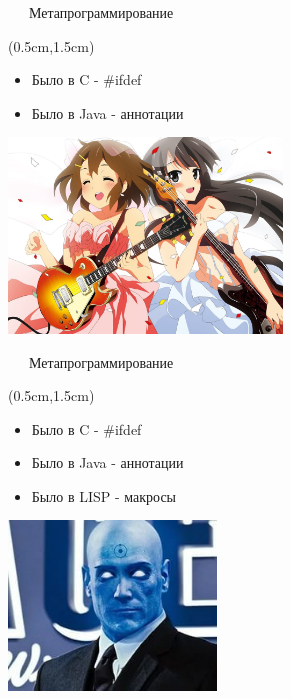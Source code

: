 \documentclass[xetex,18pt,aspectratio=43]{beamer}
\begin{document}
\begin{Large}
\begin{frame}{\ \ \ Метапрограммирование}
\begin{textblock*}{\framewidth}(0.5cm,1.5cm)
\begin{itemize}
  \item Было в C - \#ifdef
  \item Было в Java - аннотации
\end{itemize}
\begin{minipage}{\textwidth}
  \centering
  \includegraphics[height=5.2cm]{img/happiness}
\end{minipage}
\end{textblock*}
\end{frame}

\begin{frame}{\ \ \ Метапрограммирование}
\begin{textblock*}{\framewidth}(0.5cm,1.5cm)
\begin{itemize}
  \item Было в C - \#ifdef
  \item Было в Java - аннотации
  \item Было в LISP - макросы
\end{itemize}
\begin{minipage}{\textwidth}
  \centering
  \includegraphics[height=4.5cm]{img/megamind}
\end{minipage}
\end{textblock*}
\end{frame}


\end{Large}
\end{document}
